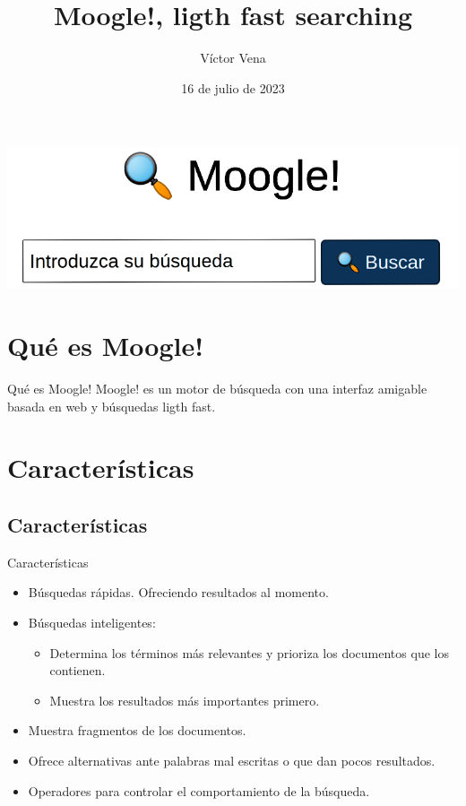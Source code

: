 \documentclass{beamer}
\title{Moogle!, ligth fast searching}
\author{Víctor Vena}
\date{16 de julio de 2023}
\begin{document}
\begin{titlepage}

   \begin{center}
    \includegraphics[scale=0.25]{Imagenes/moogle.png}
   \end{center}

\end{titlepage}

\centering

\section{Qué es Moogle!}

\begin{frame}{Qué es Moogle!}
    Moogle! es un motor de búsqueda con una interfaz amigable basada en web y búsquedas ligth fast.    
\end{frame}


\section{Características}

\subsection{Características}

\begin{frame}{Características}

    \begin{itemize}
        \item Búsquedas rápidas. Ofreciendo resultados al momento.
        \item Búsquedas inteligentes:
        \begin{itemize}
            \item Determina los términos más relevantes y prioriza los documentos que los contienen.
            \item Muestra los resultados más importantes primero.
        \end{itemize}
        \item Muestra fragmentos de los documentos.
        \item Ofrece alternativas ante palabras mal escritas o que dan pocos resultados.
        \item Operadores para controlar el comportamiento de la búsqueda.
    \end{itemize}

\end{frame}
\end{document}

